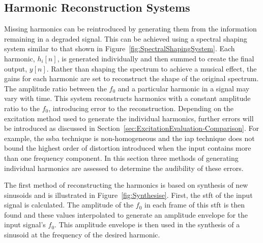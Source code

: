 	\subsection{Harmonic Reconstruction Systems}
	\label{sec:PerceptualExperiments-Reconstruction-Systems}
		Missing harmonics can be reintroduced by generating them from the information remaining in a degraded
		signal. This can be achieved using a spectral shaping system similar to that shown in
		Figure~\ref{fig:SpectralShapingSystem}. Each harmonic, $h_{i}[n]$, is generated individually and then
		summed to create the final output, $y[n]$. Rather than shaping the spectrum to achieve a musical effect,
		the gains for each harmonic are set to reconstruct the shape of the original spectrum. The amplitude ratio
		between the $f_{0}$ and a particular harmonic in a signal may vary with time. This system reconstructs
		harmonics with a constant amplitude ratio to the $f_{0}$, introducing error to the reconstruction.
		Depending on the excitation method used to generate the individual harmonics, further errors will be
		introduced as discussed in Section~\ref{sec:ExcitationEvaluation-Comparison}. For example, the
		\acrshort{ssba} technique is non-homogeneous and the \acrshort{iap} technique does not bound the highest
		order of distortion introduced when the input contains more than one frequency component. In this section
		three methods of generating individual harmonics are assessed to determine the audibility of these errors.

		The first method of reconstructing the harmonics is based on synthesis of new sinusoids and is illustrated
		in Figure~\ref{fig:Synthesise}. First, the \acrshort{stft} of the input signal is calculated. The amplitude
		of the $f_{0}$ in each frame of this \acrshort{stft} is then found and these values interpolated to
		generate an amplitude envelope for the input signal's $f_{0}$. This amplitude envelope is then used in the
		synthesis of a sinusoid at the frequency of the desired harmonic.

